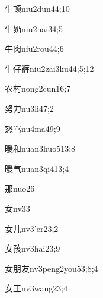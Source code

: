 \begin{verbete}{牛顿}{niu2dun4}{4;10}
\end{verbete}
\begin{verbete}{牛奶}{niu2nai3}{4;5}
\end{verbete}
\begin{verbete}{牛肉}{niu2rou4}{4;6}
\end{verbete}
\begin{verbete}{牛仔裤}{niu2zai3ku4}{4;5;12}
\end{verbete}
\begin{verbete}{农村}{nong2cun1}{6;7}
\end{verbete}
\begin{verbete}{努力}{nu3li4}{7;2}
\end{verbete}
\begin{verbete}{怒骂}{nu4ma4}{9;9}
\end{verbete}
\begin{verbete}{暖和}{nuan3huo5}{13;8}
\end{verbete}
\begin{verbete}{暖气}{nuan3qi4}{13;4}
\end{verbete}
\begin{verbete}{那}{nuo2}{6}
\end{verbete}
\begin{verbete}{女}{nv3}{3}
\end{verbete}
\begin{verbete}{女儿}{nv3'er2}{3;2}
\end{verbete}
\begin{verbete}{女孩}{nv3hai2}{3;9}
\end{verbete}
\begin{verbete}{女朋友}{nv3peng2you5}{3;8;4}
\end{verbete}
\begin{verbete}{女王}{nv3wang2}{3;4}
\end{verbete}

